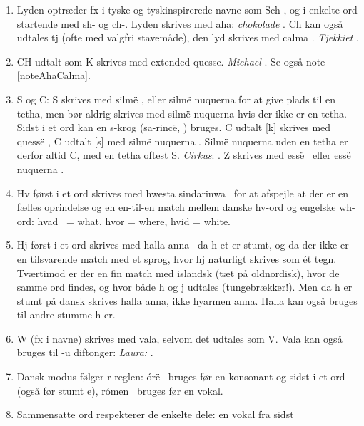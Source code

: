 \documentclass[a4paper]{article}
\begin{document}
\begin{enumerate}
  \Tmalta\Tanna\TTdot.\label{noteJ}
\item Lyden \textipa{[S]} optræder fx i tyske og tyskinspirerede navne
  som Sch-, og i enkelte ord startende med sh- og ch-.  Lyden skrives
  med aha: \emph{chokolade}
  \Taha\Tquesse\TTrightcurl\Tlambe\TTrightcurl\Tanto\TTthreedots\TTdotbelow.
  Ch kan også udtales tj \textipa{[tS]} (ofte med valgfri stavemåde),
  den lyd skrives med calma \Tcalma.  \emph{Tjekkiet}
  \Tcalma\Tquesse\TTacute\TTdoubler\Ttelco\TTdot\Ttinco\TTacute.
\item CH udtalt som K skrives med extended quesse.  \emph{Michael}
  \Tmalta\Textendedquesse\TTdot\Ttelco\TTthreedots\TTdotbelow\Tlambe.
  Se også note \ref{noteAhaCalma}.
\item S og C: S skrives med silm\"e \Tsilme, eller silm\"e nuquerna
  for at give plads til en tetha, men bør aldrig skrives med silm\"e
  nuquerna hvis der ikke er en tetha.  Sidst i et ord kan en s-krog
  (sa-rinc\"e, \Tempty\Trighthook) bruges.  C udtalt [k] skrives med quess\"e
  \Tquesse, C udtalt [s] med silm\"e nuquerna \Tsilmenuquerna.
  Silm\"e nuquerna uden en tetha er derfor altid C, med en tetha
  oftest S.  \emph{Cirkus}:
  \Tsilmenuquerna\Toore\TTdot\Tquesse\Tsilmenuquerna\TTrightcurl. Z
  skrives med ess\"e \Tesse ~eller ess\"e nuquerna \Tessenuquerna.
\item Hv først i et ord skrives med hwesta sindarinwa
  \Thwestasindarinwa ~for at afspejle at der er en fælles oprindelse
  og en en-til-en match mellem danske hv-ord og engelske wh-ord: hvad
  \Thwestasindarinwa\Tanto\TTthreedots ~= what, hvor = where, hvid =
  white.
\item Hj først i et ord skrives med halla anna \Thalla\Tanna ~da h-et
  er stumt, og da der ikke er en tilsvarende match med et sprog, hvor
  hj naturligt skrives som \'et tegn.  Tværtimod er der en fin match med
  islandsk (tæt på oldnordisk), hvor de samme ord findes, og hvor både
  h og j udtales (tungebrækker!).  Men da h er stumt på dansk skrives halla
  anna, ikke hyarmen anna.  Halla kan også bruges til andre stumme
  h-er.
\item W (fx i navne) skrives med vala, selvom det udtales som V.  Vala
  kan også bruges til -u diftonger: \emph{Laura:}
  \Tlambe\Tvala\TTthreedots\Troomen\Ttelco\TTthreedots.
\item Dansk modus følger r-reglen: \'or\"e \Toore ~bruges før en
  konsonant og sidst i et ord (også før stumt e), r\'omen \Troomen
  ~bruges før en vokal.
\item  Sammensatte ord respekterer de enkelte dele: en vokal fra sidst

\end{enumerate}
\end{document}
